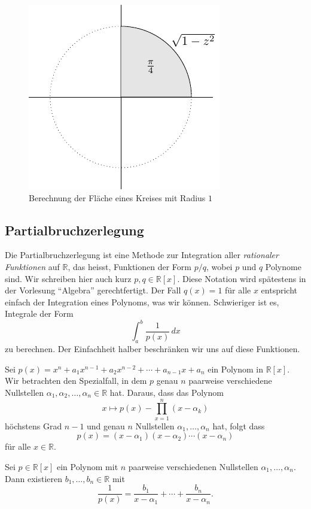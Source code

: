 \documentclass[../main.tex]{subfiles}
\begin{document}
\begin{figure}[htb]
  \centering
  \includegraphics{images/circle-area}
  \caption{Berechnung der Fläche eines Kreises mit Radius $1$}%
  \label{fig:circle-area}
\end{figure}

\subsection*{Partialbruchzerlegung}
Die Partialbruchzerlegung ist eine Methode
zur Integration aller \emph{rationaler Funktionen}
auf $\mathbb{R}$,
das heisst, Funktionen der Form
$p/q$, wobei $p$ und $q$ Polynome sind.
Wir schreiben hier auch kurz $p, q \in \mathbb{R}[x]$.
Diese Notation wird spätestens in der Vorlesung
``Algebra'' gerechtfertigt.
Der Fall $q(x) = 1$ für alle $x$ entspricht einfach
der Integration eines Polynoms, was wir können.
Schwieriger ist es, Integrale der Form
\[
  \int_{a}^{b} \frac{1}{p(x)} \, dx
\]
zu berechnen.
Der Einfachheit halber beschränken wir uns auf diese Funktionen.

Sei
\(
  p(x) = x^n + a_1 x^{n-1} + a_2 x^{n-2} + \cdots
  + a_{n-1} x + a_n
\)
ein Polynom in $\mathbb{R}[x]$.
Wir betrachten den Spezialfall,
in dem $p$ genau $n$ paarweise verschiedene
Nullstellen $\alpha_1, \alpha_2, \dots, \alpha_n \in \mathbb{R}$ 
hat.
Daraus, dass das Polynom
\[
  x \mapsto p(x) - \prod_{x=1}^{n} (x - \alpha_k)
\]
höchstens Grad $n-1$ und genau $n$ Nullstellen
$\alpha_1, \dots, \alpha_n$ hat, folgt dass
\[
  p(x) = (x - \alpha_1) (x - \alpha_2) \cdots (x - \alpha_n)
\]
für alle $x \in \mathbb{R}$.

\begin{lemma}[Partialbruchzerlegung]\label{lem:partial-fractions}
  Sei $p \in \mathbb{R}[x]$ ein Polynom mit $n$ 
  paarweise verschiedenen Nullstellen
  $\alpha_1, \dots, \alpha_n$.
  Dann existieren $b_1, \dots, b_n \in \mathbb{R}$
  mit
  \[
    \frac{1}{p(x)} = \frac{b_1}{x - \alpha_1}
    + \cdots + \frac{b_n}{x - \alpha_n}.
  \]
\end{lemma}
\end{document}
